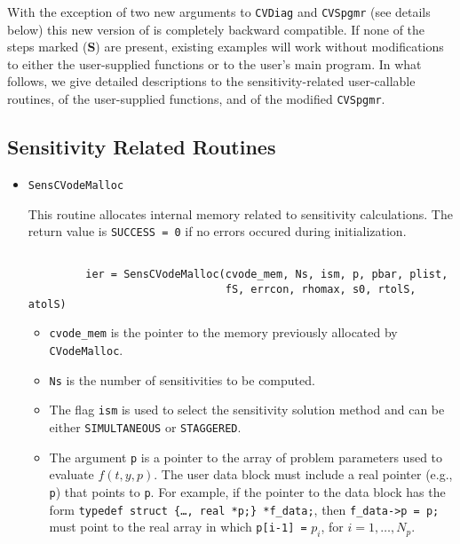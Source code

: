 With the exception of two new arguments to {\tt CVDiag} and {\tt CVSpgmr} 
(see details below) this new version of {\codeS} is completely backward compatible.
If none of the steps marked ({\bf S}) are present, existing examples will work without
modifications to either the user-supplied functions or to the user's main program.
In what follows, we give detailed descriptions to the sensitivity-related user-callable
routines, of the user-supplied functions, and of the modified {\tt CVSpgmr}.

\subsection{Sensitivity Related Routines}

\begin{itemize}

\item {\tt SensCVodeMalloc}

This routine allocates internal memory related to sensitivity calculations.
The return value is {\tt SUCCESS = 0} if no errors occured during initialization.
\begin{verbatim}

         ier = SensCVodeMalloc(cvode_mem, Ns, ism, p, pbar, plist, 
                               fS, errcon, rhomax, s0, rtolS, atolS)

\end{verbatim}

\begin{itemize}
\item {\tt cvode\_mem} is the pointer to the memory previously allocated
  by {\tt CVodeMalloc}. 

\item {\tt Ns} is the number of sensitivities to be computed.

\item The flag {\tt ism} is used to select the sensitivity solution method and can 
  be either {\tt SIMULTANEOUS} or {\tt STAGGERED}.

\item The argument {\tt p} is a pointer to the array of problem parameters used to
  evaluate $f(t,y,p)$.
  The user data block must include a real pointer (e.g., {\tt p})
  that points to {\tt p}. For example, if the pointer to the data block has the 
  form {\tt typedef struct \{\ldots, real *p;\} *f\_data;}, 
  then {\tt f\_data->p = p;} must point to the real array in which 
  {\tt p[i-1] =} $p_i$, for $i=1,\ldots,N_p$.


\end{itemize}
\end{itemize}
